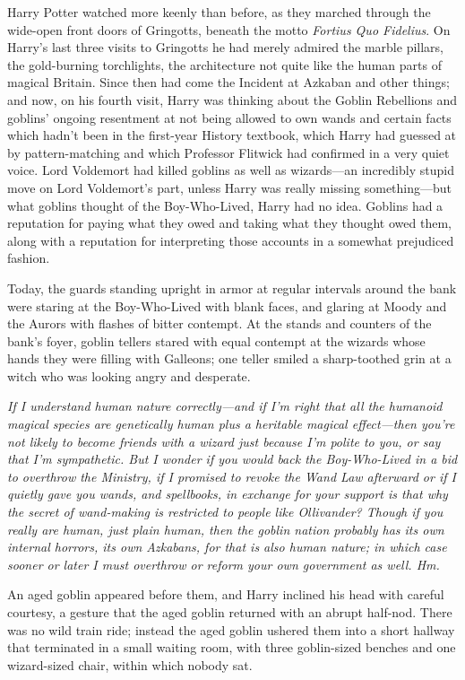 Harry Potter watched more keenly than before, as they marched through the
wide-open front doors of Gringotts, beneath the motto \emph{Fortius Quo
Fidelius}. On Harry's last three visits to Gringotts he had merely admired the
marble pillars, the gold-burning torchlights, the architecture not quite like
the human parts of magical Britain. Since then had come the Incident at Azkaban
and other things; and now, on his fourth visit, Harry was thinking about the
Goblin Rebellions and goblins' ongoing resentment at not being allowed to own
wands and certain facts which hadn't been in the first-year History textbook,
which Harry had guessed at by pattern-matching and which Professor Flitwick had
confirmed in a very quiet voice. Lord Voldemort had killed goblins as well as
wizards---an incredibly stupid move on Lord Voldemort's part, unless Harry was
really missing something---but what goblins thought of the Boy-Who-Lived, Harry
had no idea. Goblins had a reputation for paying what they owed and taking what
they thought owed them, along with a reputation for interpreting those accounts
in a somewhat prejudiced fashion.

Today, the guards standing upright in armor at regular intervals around the
bank were staring at the Boy-Who-Lived with blank faces, and glaring at Moody
and the Aurors with flashes of bitter contempt. At the stands and counters of
the bank's foyer, goblin tellers stared with equal contempt at the wizards
whose hands they were filling with Galleons; one teller smiled a sharp-toothed
grin at a witch who was looking angry and desperate.

\emph{If I understand human nature correctly---and if I'm right that all the
humanoid magical species are genetically human plus a heritable magical
effect---then you're not likely to become friends with a wizard just because
I'm polite to you, or say that I'm sympathetic. But I wonder if you would back
the Boy-Who-Lived in a bid to overthrow the Ministry, if I promised to revoke
the Wand Law afterward{\el} or if I quietly gave you wands, and spellbooks,
in exchange for your support{\el} is that why the secret of wand-making is
restricted to people like Ollivander? Though if you really are human, just
plain human, then the goblin nation probably has its own internal horrors, its
own Azkabans, for that is also human nature; in which case sooner or later I
must overthrow or reform your own government as well. Hm.}

An aged goblin appeared before them, and Harry inclined his head with careful
courtesy, a gesture that the aged goblin returned with an abrupt half-nod.
There was no wild train ride; instead the aged goblin ushered them into a short
hallway that terminated in a small waiting room, with three goblin-sized
benches and one wizard-sized chair, within which nobody sat.

